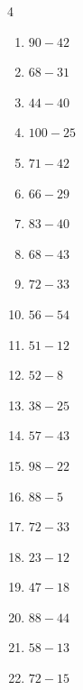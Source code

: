 \begin{multicols}{4}
\begin{enumerate}
  \item $90-42$
        \phantom{$=48$}

  \item $68-31$
        \phantom{$=37$}

  \item $44-40$
        \phantom{$=4$}

  \item $100-25$
        \phantom{$=75$}

  \item $71-42$
        \phantom{$=29$}

  \item $66-29$
        \phantom{$=37$}

  \item $83-40$
        \phantom{$=43$}

  \item $68-43$
        \phantom{$=25$}

  \item $72-33$
        \phantom{$=39$}

  \item $56-54$
        \phantom{$=2$}

  \item $51-12$
        \phantom{$=39$}

  \item $52-8$
        \phantom{$=44$}

  \item $38-25$
        \phantom{$=13$}

  \item $57-43$
        \phantom{$=14$}

  \item $98-22$
        \phantom{$=76$}

  \item $88-5$
        \phantom{$=83$}

  \item $72-33$
        \phantom{$=39$}

  \item $23-12$
        \phantom{$=11$}

  \item $47-18$
        \phantom{$=29$}

\columnbreak %

  \item $88-44$
        \phantom{$=44$}

  \item $58-13$
        \phantom{$=45$}

  \item $72-15$
        \phantom{$=57$}


\end{enumerate}
\end{multicols}
